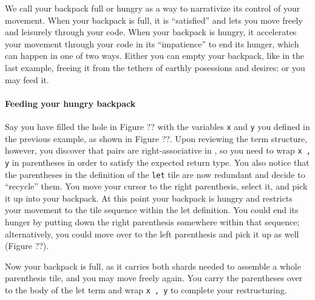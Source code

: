 We call your backpack full or hungry as a way
to narrativize its control of your movement.
When your backpack is full, it is ``satisfied''
and lets you move freely and leisurely through
your code.
When your backpack is hungry, it accelerates your
movement through your code in its ``impatience''
to end its hunger, which can happen in one of two ways.
Either you can empty your backpack, like in the last example,
freeing it from the tethers of earthly posessions
and desires; or you may feed it.



\paragraph{Feeding your hungry backpack}
Say you have filled the hole in Figure ?? with
the variables \texttt{x} and \texttt{y} you defined
in the previous example, as shown in Figure ??.
Upon reviewing the term structure, however, you
discover that pairs are right-associative in \tylr,
so you need to wrap \texttt{x , y} in parentheses
in order to satisfy the expected return type.
You also notice that the parentheses in the definition
of the \texttt{let} tile are now redundant
and decide to ``recycle'' them.
You move your cursor to the right parenthesis,
select it, and pick it up into your backpack.
At this point your backpack is hungry and restricts
your movement to the tile sequence within the
let definition.
You could end its hunger by putting down
the right parenthesis somewhere within that sequence;
alternatively, you could move over to the
left parenthesis and pick it up as well (Figure ??).

Now your backpack is full, as it carries both shards
needed to assemble a whole parenthesis tile,
and you may move freely again.
You carry the parentheses over to the body of the
let term and wrap \texttt{x , y} to complete your
restructuring.

